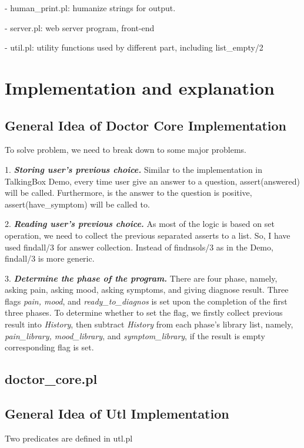 \documentclass[11pt]{article}
\begin{document}
- human\_print.pl: humanize strings for output.

- server.pl: web server program, front-end

- util.pl: utility functions used by different part, including list\_empty/2

\section*{Implementation and explanation}
\subsection*{General Idea of Doctor Core Implementation}
To solve problem, we need to break down to some major problems.

1. \textbf{\emph{Storing user's previous choice.}} Similar to the implementation in TalkingBox Demo, every time user give an answer to a question, assert(answered) will be called. Furthermore, is the answer to the question is positive, assert(have\_symptom) will be called to.

2. \textbf{\emph{Reading user's previous choice.}} As most of the logic is based on set operation, we need to collect the previous separated asserts to a list. So, I have used findall/3 for answer collection. Instead of findnsols/3 as in the Demo, findall/3 is more generic.

3. \textbf{\emph{Determine the phase of the program.}} There are four phase, namely, asking pain, asking mood, asking symptoms, and giving diagnose result. Three flags \emph{pain, mood}, and \emph{ready\_to\_diagnos} is set upon the completion of the first three phases. To determine whether to set the flag, we firstly collect previous result into \emph{History}, then subtract \emph{History} from each phase's library list, namely, \emph{pain\_library, mood\_library}, and \emph{symptom\_library}, if the result is empty corresponding flag is set.

\subsection*{doctor\_core.pl}


\subsection*{General Idea of Utl Implementation}
Two predicates are defined in utl.pl 
\end{document}
